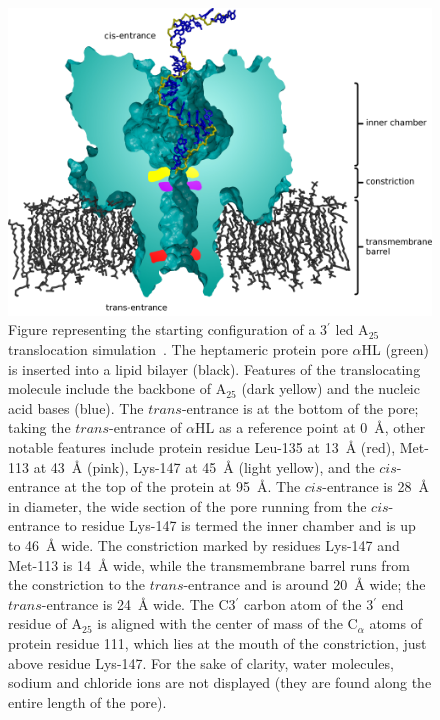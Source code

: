 \documentclass[a4paper,10pt]{article}
\newcommand{\atf}{A$_{25}$ }
\newcommand{\ahl}{$\alpha$HL }
\newcommand{\prim}{$^{\prime}$ }
\begin{document}
\begin{figure}[!h]
  \begin{center}
    \includegraphics[width=5.0in]{ahl_labelled13}
  \end{center}
  \caption{Figure representing the starting configuration of a 3\prim
    led \atf translocation simulation~\cite{jctc_cover}. The
    heptameric protein pore \ahl (green) is inserted into a lipid
    bilayer (black). Features of the translocating molecule include
    the backbone of \atf (dark yellow) and the nucleic acid bases
    (blue). The $trans$-entrance is at the bottom of the pore; taking
    the $trans$-entrance of \ahl as a reference point at 0~{\AA},
    other notable features include protein residue Leu-135 at 13~{\AA}
    (red), Met-113 at 43~{\AA} (pink), Lys-147 at 45~{\AA} (light
    yellow), and the $cis$-entrance at the top of the protein at
    95~{\AA}. The $cis$-entrance is 28~{\AA} in diameter, the wide
    section of the pore running from the $cis$-entrance to residue
    Lys-147 is termed the inner chamber and is up to 46~{\AA}
    wide. The constriction marked by residues Lys-147 and Met-113 is
    14~{\AA} wide, while the transmembrane barrel runs from the
    constriction to the $trans$-entrance and is around 20~{\AA} wide;
    the $trans$-entrance is 24~{\AA} wide. The C3\prim carbon atom of
    the 3\prim end residue of \atf is aligned with the center of mass
    of the C$_{\alpha}$ atoms of protein residue 111, which lies at
    the mouth of the constriction, just above residue Lys-147. For the
    sake of clarity, water molecules, sodium and chloride ions are not
    displayed (they are found along the entire length of the pore).}
  \label{fig:edge}
\end{figure} 
\end{document}
